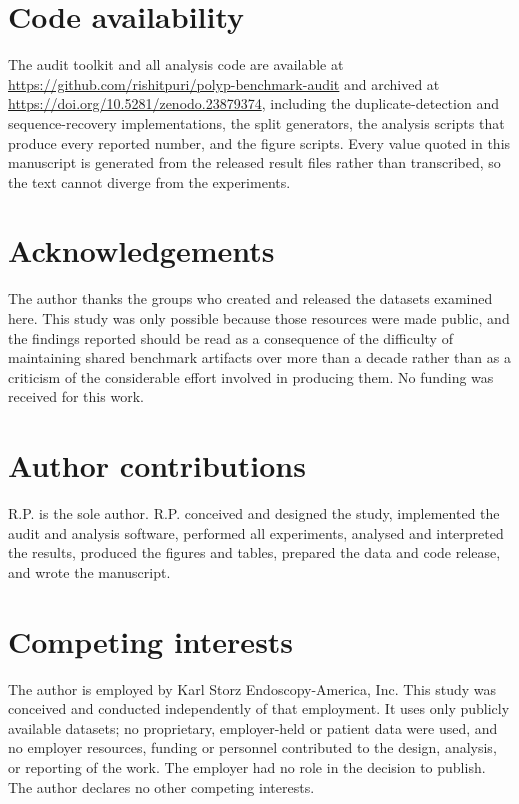\documentclass[11pt]{article}
\begin{document}
\section*{Code availability}

The audit toolkit and all analysis code are available at
\url{https://github.com/rishitpuri/polyp-benchmark-audit} and archived at
\url{https://doi.org/10.5281/zenodo.23879374}, including the
duplicate-detection and
sequence-recovery implementations, the split generators, the analysis scripts
that produce every reported number, and the figure scripts. Every value quoted
in this manuscript is generated from the released result files rather than
transcribed, so the text cannot diverge from the experiments.

\section*{Acknowledgements}
The author thanks the groups who created and released the datasets examined
here. This study was only possible because those resources were made public,
and the findings reported should be read as a consequence of the difficulty
of maintaining shared benchmark artifacts over more than a decade rather than
as a criticism of the considerable effort involved in producing them. No
funding was received for this work.

\section*{Author contributions}
R.P. is the sole author. R.P. conceived and designed the study, implemented
the audit and analysis software, performed all experiments, analysed and
interpreted the results, produced the figures and tables, prepared the data
and code release, and wrote the manuscript.

\section*{Competing interests}
The author is employed by Karl Storz Endoscopy-America, Inc. This study was
conceived and conducted independently of that employment. It uses only
publicly available datasets; no proprietary, employer-held or patient data
were used, and no employer resources, funding or personnel contributed to the
design, analysis, or reporting of the work. The employer had no role in the
decision to publish. The author declares no other competing interests.



\end{document}
